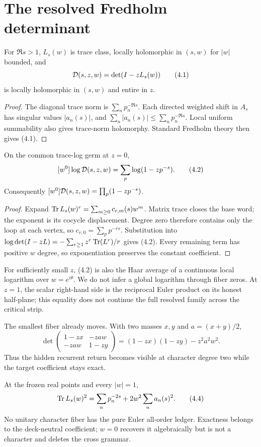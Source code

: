 \section{The resolved Fredholm determinant}

\begin{theorem}
\label{thm:trace-class}
For $\Re s>1$, $L_s(w)$ is trace class, locally holomorphic in $(s,w)$ for
$|w|$ bounded, and
\[
 \mathcal D(s,z,w)=\det(I-zL_s(w))                            \tag{4.1}
\]
is locally holomorphic in $(s,w)$ and entire in $z$.
\end{theorem}
\begin{proof}
The diagonal trace norm is $\sum_np_n^{-\Re s}$.  Each directed weighted
shift in $A_s$ has singular values $|a_n(s)|$, and
$\sum_n|a_n(s)|\le\sum_np_n^{-\Re s}$.  Local uniform
summability also gives trace-norm holomorphy.  Standard Fredholm theory then
gives (4.1).
\end{proof}

\begin{theorem}
\label{thm:zero-mode}
On the common trace-log germ at $z=0$,
\[
 [w^0]\log\mathcal D(s,z,w)
 =\sum_p\log(1-zp^{-s}).                               \tag{4.2}
\]
Consequently $[w^0]\mathcal D(s,z,w)=\prod_p(1-zp^{-s})$.
\end{theorem}
\begin{proof}
Expand
$\operatorname{Tr} L_s(w)^r=\sum_{m\ge0}c_{r,m}(s)w^m$.  Matrix trace
closes the base word; the exponent is its cocycle displacement.  Degree zero
therefore contains only the loop at each vertex, so
$c_{r,0}=\sum_pp^{-rs}$.  Substitution into
$\log\det(I-zL)=-\sum_{r\ge1}z^r\operatorname{Tr}(L^r)/r$ gives (4.2).
Every remaining term has positive $w$ degree, so exponentiation preserves the
constant coefficient.
\end{proof}

For sufficiently small $z$, (4.2) is also the Haar average of a continuous
local logarithm over $w=e^{i\theta}$.  We do not infer a global logarithm
through fiber zeros.  At $z=1$, the scalar right-hand side is the reciprocal
Euler product on its honest half-plane; this equality does not continue the
full resolved family across the critical strip.

The smallest fiber already moves.  With two masses $x,y$ and
$a=(x+y)/2$,
\[
 \det\!\begin{pmatrix}1-zx&-zaw\\-zaw&1-zy\end{pmatrix}
 =(1-zx)(1-zy)-z^2a^2w^2.                              \tag{4.3}
\]
Thus the hidden recurrent return becomes visible at character degree two
while the target coefficient stays exact.

\begin{corollary}
\label{cor:no-fiber}
At the frozen real points and every $|w|=1$,
\[
 \operatorname{Tr} L_s(w)^2=\sum_n p_n^{-2s}+2w^2\sum_na_n(s)^2.     \tag{4.4}
\]
No unitary character fiber has the pure Euler all-order ledger.  Exactness
belongs to the deck-neutral coefficient; $w=0$ recovers it algebraically but
is not a character and deletes the cross grammar.
\end{corollary}
